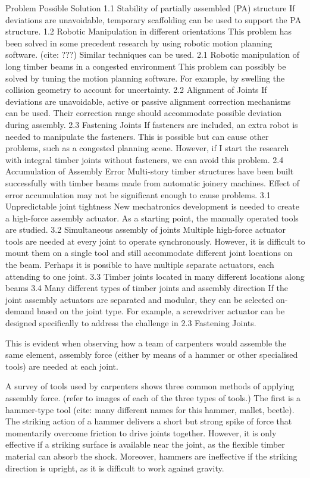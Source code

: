 Problem
Possible Solution
 1.1 Stability of partially assembled (PA) structure
If deviations are unavoidable, temporary scaffolding can be used to support the PA structure.
1.2 Robotic Manipulation in different orientations 
This problem has been solved in some precedent research by using robotic motion planning software. (cite: ???) Similar techniques can be used.
2.1 Robotic manipulation of long timber beams in a congested environment
This problem can possibly be solved by tuning the motion planning software. For example, by swelling the collision geometry to account for uncertainty.
2.2 Alignment of Joints
If deviations are unavoidable, active or passive alignment correction mechanisms can be used. Their correction range should accommodate possible deviation during assembly.
2.3 Fastening Joints
If fasteners are included, an extra robot is needed to manipulate the fasteners. This is possible but can cause other problems, such as a congested planning scene. However, if I start the research with integral timber joints without fasteners, we can avoid this problem.
2.4 Accumulation of Assembly Error
Multi-story timber structures have been built successfully with timber beams made from automatic joinery machines. Effect of error accumulation may not be significant enough to cause problems.
3.1 Unpredictable joint tightness 
New mechatronics development is needed to create a high-force assembly actuator. As a starting point, the manually operated tools are studied.
3.2 Simultaneous assembly of joints
Multiple high-force actuator tools are needed at every joint to operate synchronously. However, it is difficult to mount them on a single tool and still accommodate different joint locations on the beam. Perhaps it is possible to have multiple separate actuators, each attending to one joint.
3.3 Timber joints located in many different locations along beams
3.4 Many different types of timber joints and assembly direction
If the joint assembly actuators are separated and modular, they can be selected on-demand based on the joint type. For example, a screwdriver actuator can be designed specifically to address the challenge in 2.3 Fastening Joints.

This is evident when observing how a team of carpenters would assemble the same element, assembly force (either by means of a hammer or other specialised tools) are needed at each joint.

A survey of tools used by carpenters shows three common methods of applying assembly force. (refer to images of each of the three types of tools.) The first is a hammer-type tool (cite: many different names for this hammer, mallet, beetle). The striking action of a hammer delivers a short but strong spike of force that momentarily overcome friction to drive joints together. However, it is only effective if a striking surface is available near the joint, as the flexible timber material can absorb the shock. Moreover, hammers are ineffective if the striking direction is upright, as it is difficult to work against gravity. 

